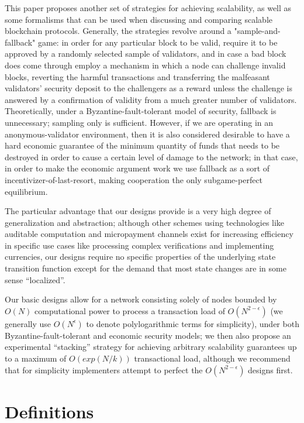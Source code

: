 \documentclass[11pt,a4paper]{report}
\theoremstyle{plain}
\theoremstyle{definition}
\theoremstyle{remark}
\begin{document}
This paper proposes another set of strategies for achieving scalability, as well as some formalisms that can be used when discussing and comparing scalable blockchain protocols. Generally, the strategies revolve around a "sample-and-fallback" game: in order for any particular block to be valid, require it to be approved by a randomly selected sample of validators, and in case a bad block does come through employ a mechanism in which a node can challenge invalid blocks, reverting the harmful transactions and transferring the malfeasant validators' security deposit to the challengers as a reward unless the challenge is answered by a confirmation of validity from a much greater number of validators. Theoretically, under a Byzantine-fault-tolerant model of security, fallback is unnecessary; sampling only is sufficient. However, if we are operating in an anonymous-validator environment, then it is also considered desirable to have a hard economic guarantee of the minimum quantity of funds that needs to be destroyed in order to cause a certain level of damage to the network; in that case, in order to make the economic argument work we use fallback as a sort of incentivizer-of-last-resort, making cooperation the only subgame-perfect equilibrium.

The particular advantage that our designs provide is a very high degree of generalization and abstraction; although other schemes using technologies like auditable computation\cite{auditable} and micropayment channels\cite{lightning} exist for increasing efficiency in specific use cases like processing complex verifications and implementing currencies, our designs require no specific properties of the underlying state transition function except for the demand that most state changes are in some sense ``localized''.

Our basic designs allow for a network consisting solely of nodes bounded by $O(N)$ computational power to process a transaction load of $O(N^{2-\epsilon})$ (we generally use $O(N^\epsilon)$ to denote polylogarithmic terms for simplicity), under both Byzantine-fault-tolerant and economic security models; we then also propose an experimental ``stacking'' strategy for achieving arbitrary scalability guarantees up to a maximum of $O(exp(N/k))$ transactional load, although we recommend that for simplicity implementers attempt to perfect the $O(N^{2-\epsilon})$ designs first.

\chapter{Definitions}
\end{document}
